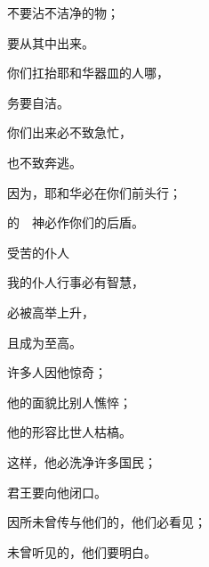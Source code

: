 {\par }{\Q 不要沾不洁净的物；
\par }{\Q 要从其中出来。
\par }{\Q 你们扛抬耶和华器皿的人哪，
\par }{\Q 务要自洁。
\par }{\Q {}你们出来必不致急忙，
\par }{\Q 也不致奔逃。
\par }{\Q 因为，耶和华必在你们前头行；
\par }{的　神必作你们的后盾。
\par }{\SH 受苦的仆人
\par }{\Q {}我的仆人行事必有智慧，
\par }{\Q 必被高举上升，
\par }{\Q 且成为至高。
\par }{\Q {}许多人因他惊奇；
\par }{\Q 他的面貌比别人憔悴；
\par }{\Q 他的形容比世人枯槁。
\par }{\Q {}这样，他必洗净许多国民；
\par }{\Q 君王要向他闭口。
\par }{\Q 因所未曾传与他们的，他们必看见；
\par }{\Q 未曾听见的，他们要明白。

}
